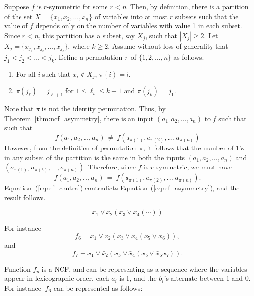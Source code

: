 Suppose $f$ is $r$-symmetric for some $r < n$.
Then, by definition, there is a partition of the set $X$ =
$\{x_1, x_2, \ldots, x_n\}$ of variables into at most $r$ subsets such that
the value of $f$ depends only on the number of variables with value 1
in each subset.
Since $r < n$, this partition has a subset, say $X_j$, 
such that $|X_j| \geq 2$.
Let $X_j = \{x_{j_1}, x_{j_2}, \ldots, x_{j_k}\}$, where $k \geq 2$.
Assume without loss of generality that $j_1 < j_2 < \ldots < j_k$.
Define a permutation $\pi$ of $\{1, 2, \ldots, n\}$ as follows. 
\begin{enumerate}
\item For all $i$ such that $x_i \not\in X_j$, $\pi(i) = i$.
\item $\pi(j_{\ell})$ = $j_{\ell+1}$ for $1 \leq \ell_t \leq k-1$
      and $\pi(j_{k})$ = $j_1$. 
\end{enumerate}
Note that $\pi$ is not the identity permutation.
Thus, by Theorem~\ref{thm:ncf_asymmetry},
there is an input $(a_1, a_2, \ldots, a_n)$ to $f$ such that
such that
\begin{equation}\label{eqn:f_asymmetry}
f(a_1, a_2, \ldots, a_n) ~\neq~  f(a_{\pi(1)}, a_{\pi(2)}, \ldots, a_{\pi(n)})
\end{equation}
However, from the definition of permutation $\pi$, it follows
that the number of 1's in any subset of the partition 
is the same in both the inputs
$(a_1, a_2, \ldots, a_n)$ and
$(a_{\pi(1)}, a_{\pi(2)}, \ldots, a_{\pi(n)})$.
Therefore, since $f$ is $r$-symmetric, we must have
\begin{equation}\label{eqn:f_contra}
f(a_1, a_2, \ldots, a_n) ~=~ f(a_{\pi(1)}, a_{\pi(2)}, \ldots, a_{\pi(n)}).
\end{equation}
Equation~(\ref{eqn:f_contra}) contradicts 
Equation~(\ref{eqn:f_asymmetry}), and the result follows. \QED
\fi


\iffalse
$$x_1 \vee \bar{x}_2 ( x_3 \vee \bar{x}_4 (\cdots  ) )$$

For instance,
$$f_6 = x_1 \vee \bar{x}_2 ( x_3 \vee \bar{x}_4 ( x_5 \vee \bar{x}_6  ) ),$$
and
$$f_7 = x_1 \vee \bar{x}_2 ( x_3 \vee \bar{x}_4 ( x_5 \vee \bar{x}_6   x_7) ).$$

Function $f_n$ is a NCF, 
and can be representing as a sequence where the variables appear in lexicographic order,
each $a_i$ is 1, and the $b_i$'s alternate between 1 and 0.
For instance, $f_6$ can be represented as follows:

